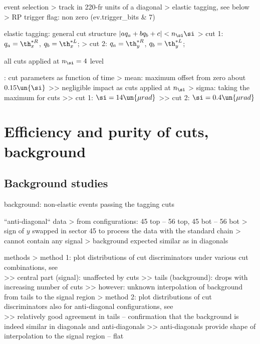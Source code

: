 \> event selection
\>> track in 220-fr units of a diagonal
\>> elastic tagging, see below
\>> RP trigger flag: non zero (ev.trigger\_bits \& 7)

\> elastic tagging: general cut structure $| a q_a + b q_b + c| < n_\si  \si$
\>> cut 1: $q_a = \th_x^{*R}$, $q_b = \th_x^{*L}$; 
\>> cut 2: $q_a = \th_y^{*R}$, $q_b = \th_y^{*L}$; 

\> all cuts applied at $n_\si = 4$ level

\>  : cut parameters as function of time
\>> mean: maximum offset from zero about $0.15\un{\si}$
\>>> negligible impact as cuts applied at $n_\si$
\>> sigma: taking the maximum for cuts
\>>> cut 1: $\si = 14\un{\mu rad}$
\>>> cut 2: $\si = 0.4\un{\mu rad}$


\section{Efficiency and purity of cuts, background}

\subsection{Background studies}

\> background: non-elastic events passing the tagging cuts

\> ``anti-diagonal`` data
\>> from configurations: 45 top -- 56 top, 45 bot -- 56 bot
\>> sign of $y$ swapped in sector 45 to process the data with the standard chain
\>> cannot contain any signal
\>> background expected similar as in diagonals

\> methods
\>> method 1: plot distributions of cut discriminators under various cut combinations, see\\ 
\>>> central part (signal): unaffected by cuts
\>>> tails (background): drops with increasing number of cuts
\>>> however: unknown interpolation of background from tails to the signal region
\>> method 2: plot distributions of cut discriminators also for anti-diagonal configurations, see\\ 
\>>> relatively good agreement in tails -- confirmation that the background is indeed similar in diagonals and anti-diagonals
\>>> anti-diagonals provide shape of interpolation to the signal region -- flat

